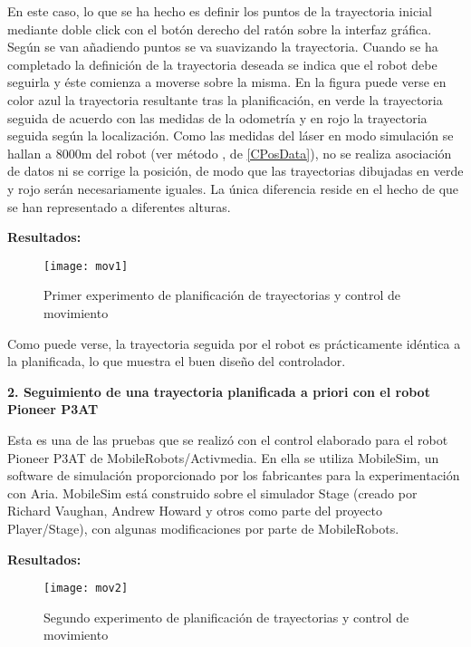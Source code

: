 En este caso, lo que se ha hecho es definir los puntos de la trayectoria inicial mediante doble click con el botón derecho del ratón sobre la interfaz gráfica. Según se van añadiendo puntos se va suavizando la trayectoria. Cuando se ha completado la definición de la trayectoria deseada se indica que el robot debe seguirla y éste comienza a moverse sobre la misma. En la figura puede verse en color azul la trayectoria resultante tras la planificación, en verde la trayectoria seguida de acuerdo con las medidas de la odometría y en rojo la trayectoria seguida según la localización. Como las medidas del láser en modo simulación se hallan a 8000m del robot (ver método , de \ref{CPosData}), no se realiza asociación de datos ni se corrige la posición, de modo que las trayectorias dibujadas en verde y rojo serán necesariamente iguales. La única diferencia reside en el hecho de que se han representado a diferentes alturas.


\textbf{Resultados:}
\begin{figure}[h]
  \centering\texttt{[image: mov1]}\\
  \caption{Primer experimento de planificación de trayectorias y control de movimiento}\label{fg:mov1}
\end{figure}

Como puede verse, la trayectoria seguida por el robot es prácticamente idéntica a la planificada, lo que muestra el buen diseño del controlador.

\noindent
\textbf{\textbf{2.} Seguimiento de una trayectoria planificada a priori con el robot Pioneer P3AT}

Esta es una de las pruebas que se realizó con el control elaborado para el robot Pioneer P3AT de MobileRobots/Activmedia. En ella se utiliza MobileSim, un software de simulación proporcionado por los fabricantes para la experimentación con Aria. MobileSim está construido sobre el simulador Stage (creado por Richard Vaughan, Andrew Howard y otros como parte del proyecto Player/Stage), con algunas modificaciones por parte de MobileRobots.


\textbf{Resultados:}
\begin{figure}[h]
  \centering\texttt{[image: mov2]}\\
  \caption{Segundo experimento de planificación de trayectorias y control de movimiento}\label{fg:mov2}
\end{figure}

